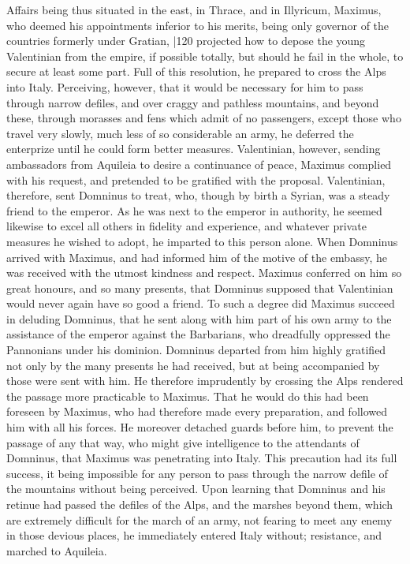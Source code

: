 Affairs being thus situated in the east, in Thrace, and in Illyricum, Maximus, who deemed his appointments inferior to his merits, being only governor of the countries formerly under Gratian,
|120 projected how to depose the young Valentinian from the empire, if possible totally, but should he fail in the whole, to secure at least some part. Full of this resolution, he prepared to cross the Alps into Italy. Perceiving, however, that it would be necessary for him to pass through narrow defiles, and over craggy and pathless mountains, and beyond these, through morasses and fens which admit of no passengers, except those who travel very slowly, much less of so considerable an army, he deferred the enterprize until he could form better measures. Valentinian, however, sending ambassadors from Aquileia to desire a continuance of peace, Maximus complied with his request, and pretended to be gratified with the proposal. Valentinian, therefore, sent Domninus to treat, who, though by birth a Syrian, was a steady friend to the emperor. As he was next to the emperor in authority, he seemed likewise to excel all others in fidelity and experience, and whatever private measures he wished to adopt, he imparted to this person alone. When Domninus arrived with Maximus, and had informed him of the motive of the embassy, he was received with the utmost kindness and respect. Maximus conferred on him so great honours, and so many presents, that Domninus supposed that Valentinian would never again have so good a friend. To such a degree did Maximus succeed in deluding Domninus, that he sent along with him part of his own army to the assistance of the emperor against the Barbarians, who dreadfully oppressed the Pannonians under his dominion. Domninus departed from him highly gratified not only by the many presents he had received, but at being accompanied by those were sent with him. He therefore imprudently by crossing the Alps rendered the passage more practicable to Maximus. That he would do this had been foreseen by Maximus, who had therefore made every preparation, and followed him with all his forces. He moreover detached guards before him, to prevent the passage of any that way, who might give intelligence to the attendants of Domninus, that Maximus was penetrating into Italy. This precaution had its full success, it being impossible for any person to pass through the narrow defile of the mountains without being perceived. Upon learning that Domninus and his retinue had passed the defiles of the Alps, and the marshes beyond them, which are extremely difficult for the march of an army, not fearing to meet any enemy in those devious places, he immediately entered Italy without; resistance, and marched to Aquileia.

